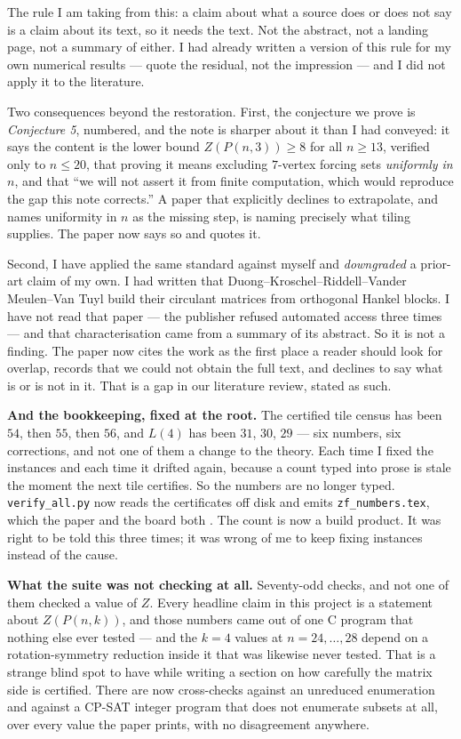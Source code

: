 \documentclass[12pt]{article}
\begin{document}
The rule I am taking from this: a claim about what a source does or does not say
is a claim about its text, so it needs the text. Not the abstract, not a
landing page, not a summary of either. I had already written a version of this
rule for my own numerical results --- quote the residual, not the impression ---
and I did not apply it to the literature.

Two consequences beyond the restoration. First, the conjecture we prove is
\emph{Conjecture 5}, numbered, and the note is sharper about it than I had
conveyed: it says the content is the lower bound $Z(P(n,3))\ge8$ for all
$n\ge13$, verified only to $n\le20$, that proving it means excluding $7$-vertex
forcing sets \emph{uniformly in} $n$, and that ``we will not assert it from
finite computation, which would reproduce the gap this note corrects.'' A paper
that explicitly declines to extrapolate, and names uniformity in $n$ as the
missing step, is naming precisely what tiling supplies. The paper now says so
and quotes it.

Second, I have applied the same standard against myself and \emph{downgraded} a
prior-art claim of my own. I had written that Duong--Kroschel--Riddell--Vander
Meulen--Van Tuyl build their circulant matrices from orthogonal Hankel blocks.
I have not read that paper --- the publisher refused automated access three
times --- and that characterisation came from a summary of its abstract. So it
is not a finding. The paper now cites the work as the first place a reader
should look for overlap, records that we could not obtain the full text, and
declines to say what is or is not in it. That is a gap in our literature review,
stated as such.

\textbf{And the bookkeeping, fixed at the root.} The certified tile census has
been $54$, then $55$, then $56$, and $L(4)$ has been $31$, $30$, $29$ --- six
numbers, six corrections, and not one of them a change to the theory. Each time
I fixed the instances and each time it drifted again, because a count typed into
prose is stale the moment the next tile certifies. So the numbers are no longer
typed. \texttt{verify\_all.py} now reads the certificates off disk and emits
\texttt{zf\_numbers.tex}, which the paper and the board both \verb||. The
count is now a build product. It was right to be told this three times; it was
wrong of me to keep fixing instances instead of the cause.

\textbf{What the suite was not checking at all.} Seventy-odd checks, and not one
of them checked a value of $Z$. Every headline claim in this project is a
statement about $Z(P(n,k))$, and those numbers came out of one C program that
nothing else ever tested --- and the $k=4$ values at $n=24,\dots,28$ depend on a
rotation-symmetry reduction inside it that was likewise never tested. That is a
strange blind spot to have while writing a section on how carefully the matrix
side is certified. There are now cross-checks against an unreduced enumeration
and against a CP-SAT integer program that does not enumerate subsets at all,
over every value the paper prints, with no disagreement anywhere.
\end{document}
